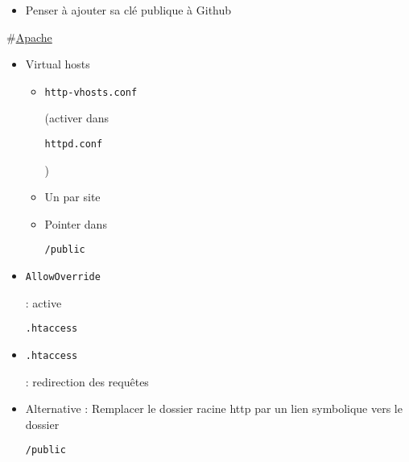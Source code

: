 \begin{otherlanguage}{english}

\begin{Shaded}
\begin{Highlighting}[]
 
 
 
 
 
 
\end{Highlighting}
\end{Shaded}

\end{otherlanguage}

\begin{itemize}
\tightlist
\item
  Penser à ajouter sa clé publique à Github
\end{itemize}

\#\href{https://help.ubuntu.com/lts/serverguide/httpd.html}{Apache}

\begin{itemize}
\tightlist
\item
  Virtual hosts

  \begin{itemize}
  \tightlist
  \item
    \begin{otherlanguage}{english}\texttt{http-vhosts.conf}\end{otherlanguage}
    (activer dans
    \begin{otherlanguage}{english}\texttt{httpd.conf}\end{otherlanguage})
  \item
    Un par site
  \item
    Pointer dans
    \begin{otherlanguage}{english}\texttt{/public}\end{otherlanguage}
  \end{itemize}
\item
  \begin{otherlanguage}{english}\texttt{AllowOverride}\end{otherlanguage}
  : active
  \begin{otherlanguage}{english}\texttt{.htaccess}\end{otherlanguage}
\item
  \begin{otherlanguage}{english}\texttt{.htaccess}\end{otherlanguage} :
  redirection des requêtes
\item
  Alternative : Remplacer le dossier racine http par un lien symbolique
  vers le dossier
  \begin{otherlanguage}{english}\texttt{/public}\end{otherlanguage}
\end{itemize}

